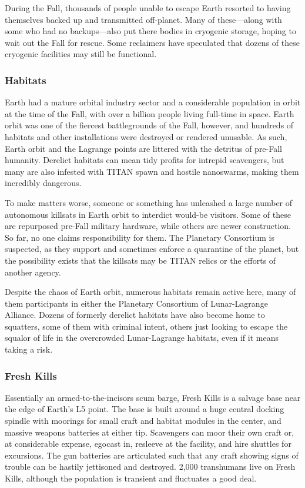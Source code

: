 During the Fall, thousands of people unable to escape Earth resorted to having themselves backed up and transmitted off-planet. Many of these—along with some who had no backups—also put there bodies in cryogenic storage, hoping to wait out the Fall for rescue. Some reclaimers have speculated that dozens of these cryogenic facilities may still be functional. 

\subsubsection{Habitats} \label{sec:habitats-2} 

Earth had a mature orbital industry sector and a considerable population in orbit at the time of the Fall, with over a billion people living full-time in space. Earth orbit was one of the fiercest battlegrounds of the Fall, however, and hundreds of habitats and other installations were destroyed or rendered unusable. As such, Earth orbit and the Lagrange points are littered with the detritus of pre-Fall humanity. Derelict habitats can mean tidy profits for intrepid scavengers, but many are also infested with TITAN spawn and hostile nanoswarms, making them incredibly dangerous. 

To make matters worse, someone or something has unleashed a large number of autonomous killsats in Earth orbit to interdict would-be visitors. Some of these are repurposed pre-Fall military hardware, while others are newer construction. So far, no one claims responsibility for them. The Planetary Consortium is suspected, as they support and sometimes enforce a quarantine of the planet, but the possibility exists that the killsats may be TITAN relics or the efforts of another agency. 

Despite the chaos of Earth orbit, numerous habitats remain active here, many of them participants in either the Planetary Consortium of Lunar-Lagrange Alliance. Dozens of formerly derelict habitats have also become home to squatters, some of them with criminal intent, others just looking to escape the squalor of life in the overcrowded Lunar-Lagrange habitats, even if it means taking a risk. 

\subsubsection{Fresh Kills} \label{sec:fresh-kills} 

Essentially an armed-to-the-incisors scum barge, Fresh Kills is a salvage base near the edge of Earth's L5 point. The base is built around a huge central docking spindle with moorings for small craft and habitat modules in the center, and massive weapons batteries at either tip. Scavengers can moor their own craft or, at considerable expense, egocast in, resleeve at the facility, and hire shuttles for excursions. The gun batteries are articulated such that any craft showing signs of trouble can be hastily jettisoned and destroyed. 2,000 transhumans live on Fresh Kills, although the population is transient and fluctuates a good deal. 

